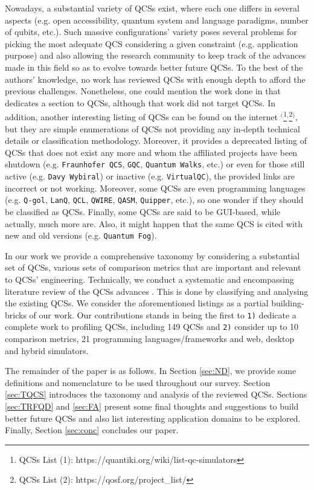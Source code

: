 \documentclass[conference]{IEEEtran}
\begin{document}
 
Nowadays, a substantial variety of QCSs exist, where each one differs in several aspects (e.g. open accessibility, quantum system and language paradigms, number of qubits, etc.). Such massive configurations' variety poses several problems for picking the most adequate QCS considering a given constraint (e.g. application purpose) and also allowing the research community to keep track of the advances made in this field so as to evolve towards better future QCSs. To the best of the authors' knowledge, no work has reviewed QCSs with enough depth to afford the previous challenges. Nonetheless, one could mention the work done in \cite{ref_1} that dedicates a section to QCSs, although that work did not target QCSs. In addition, another interesting listing of QCSs can be found on the internet $^($\footnote{QCSs List (1): https://quantiki.org/wiki/list-qc-simulators}$^,$\footnote{QCSs List (2): https://qosf.org/project\_list/}$^)$, but they are simple enumerations of QCSs not providing any in-depth technical details or classification methodology. Moreover, it provides a deprecated listing of QCSs that does not exist any more and whom the affiliated projects have been shutdown (e.g. \texttt{Fraunhofer QCS}, \texttt{GQC}, \texttt{Quantum Walks}, etc.) or even for those still active (e.g. \texttt{Davy Wybiral}) or  inactive (e.g. \texttt{VirtualQC}), the provided links are incorrect or not working. Moreover, some QCSs are even programming languages (e.g. \texttt{Q-gol}, \texttt{LanQ}, \texttt{QCL}, \texttt{QWIRE}, \texttt{QASM}, \texttt{Quipper}, etc.), so one wonder if they should be classified as QCSs. Finally, some QCSs are said to be GUI-based, while actually, much more are. Also, it might happen that the same QCS is cited with new and old versions (e.g. \texttt{Quantum Fog}).  
 
 
In our work we provide a comprehensive taxonomy by considering a substantial set of QCSs, various sets of comparison metrics that are important and relevant to QCSs' engineering. Technically, we conduct a systematic and encompassing literature review of the QCSs advances \cite{ref_7}. This is done by classifying and analysing the existing QCSs. We consider  the aforementioned listings as a partial building-bricks of our work. Our contributions stands in being the first to \texttt{1)} dedicate a complete work to profiling QCSs, including 149 QCSs and \texttt{2)} consider up to 10 comparison metrics, 21 programming languages/frameworks and web, desktop and hybrid simulators. 

 
The remainder of the paper is as follows. In Section \ref{sec:ND}, we provide some definitions and nomenclature to be used throughout our survey. Section \ref{sec:TQCS} introduces the taxonomy and analysis of the reviewed QCSs. Sections \ref{sec:TRFQD} and \ref{sec:FA} present some final thoughts and suggestions to build better future QCSs and also list interesting application domains to be explored. Finally, Section \ref{sec:conc} concludes our paper.
\end{document}
